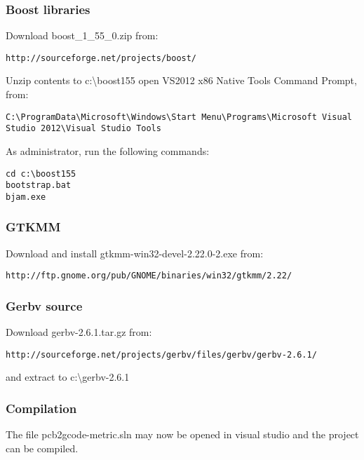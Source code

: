 \documentclass[a4paper,11pt]{article}  %
\begin{document}
\subsubsection{Boost libraries}
Download boost\_1\_55\_0.zip from:
\begin{lstlisting}[frame=single,breaklines=true]
http://sourceforge.net/projects/boost/
\end{lstlisting}

Unzip contents to c:\textbackslash boost155
open VS2012 x86 Native Tools Command Prompt, from:
\begin{lstlisting}[frame=single,breaklines=true]
 C:\ProgramData\Microsoft\Windows\Start Menu\Programs\Microsoft Visual Studio 2012\Visual Studio Tools
\end{lstlisting}

As administrator, run the following commands:
\begin{lstlisting}[frame=single,breaklines=true]
cd c:\boost155
bootstrap.bat
bjam.exe
\end{lstlisting}

\subsubsection{GTKMM}
Download and install gtkmm-win32-devel-2.22.0-2.exe from:
\begin{lstlisting}[frame=single,breaklines=true]
http://ftp.gnome.org/pub/GNOME/binaries/win32/gtkmm/2.22/
\end{lstlisting}

\subsubsection{Gerbv source}
Download gerbv-2.6.1.tar.gz from:
\begin{lstlisting}[frame=single,breaklines=true]
http://sourceforge.net/projects/gerbv/files/gerbv/gerbv-2.6.1/
\end{lstlisting}
and extract to c:\textbackslash gerbv-2.6.1

\subsubsection{Compilation}
The file pcb2gcode-metric.sln may now be opened in visual studio and the project can be compiled.

\end{document}
